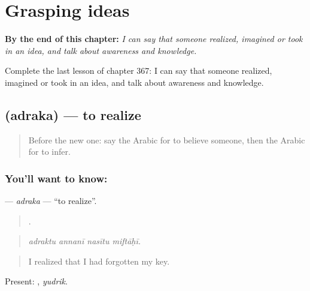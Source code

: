 
\chapter{Grasping ideas}
\label{ch:ar-grasping-ideas}

\begin{chapteropening}
\textbf{By the end of this chapter:} \emph{I can say that someone realized, imagined or took in an idea, and talk about awareness and knowledge.}

Complete the last lesson of chapter 367: I can say that someone realized, imagined or took in an idea, and talk about awareness and knowledge.
\end{chapteropening}

\section[\texorpdfstring{\ar{أدرك} (adraka)}{أدرك (adraka)}]{ (adraka) — to realize}

\label{lesson:AR-C367-adraka}



\begin{quote}
Before the new one: say the Arabic for to believe someone, then the Arabic for to infer.
\end{quote}

\subsection*{You'll want to know: }
\textbf{} — \emph{adraka} — \textquotedblleft{}to realize\textquotedblright{}.

\begin{quote}
   .
\end{quote}

\begin{quote}
\emph{adraktu annanī nasītu miftāḥī.}
\end{quote}

\begin{quote}
I realized that I had forgotten my key.
\end{quote}

Present: , \emph{yudrik}.

